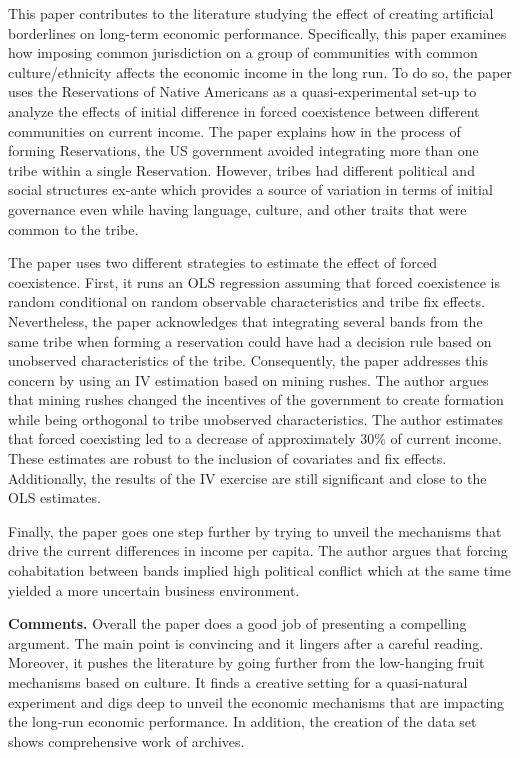 This paper contributes to the literature studying the effect of creating artificial borderlines on long-term economic performance. Specifically, this paper examines how imposing common jurisdiction on a group of communities with common culture/ethnicity affects the economic income in the long run. To do so, the paper uses the Reservations of Native Americans as a quasi-experimental set-up to analyze the effects of initial difference in forced coexistence between different communities on current income. The paper explains how in the process of forming Reservations, the US government avoided integrating more than one tribe within a single Reservation. However, tribes had different political and social structures ex-ante which provides a source of variation in terms of initial governance even while having language, culture, and other traits that were common to the tribe. 

The paper uses two different strategies to estimate the effect of forced coexistence. First, it runs an OLS regression assuming that forced coexistence is random conditional on random observable characteristics and tribe fix effects. Nevertheless, the paper acknowledges that integrating several bands from the same tribe when forming a reservation could have had a decision rule based on unobserved characteristics of the tribe. Consequently, the paper addresses this concern by using an IV estimation based on mining rushes. The author argues that mining rushes changed the incentives of the government to create formation while being orthogonal to tribe unobserved characteristics. The author estimates that forced coexisting led to a decrease of approximately 30\% of current income. These estimates are robust to the inclusion of covariates and fix effects. Additionally, the results of the IV exercise are still significant and close to the OLS estimates. 

Finally, the paper goes one step further by trying to unveil the mechanisms that drive the current differences in income per capita. The author argues that forcing cohabitation between bands implied high political conflict which at the same time yielded a more uncertain business environment. 

\textbf{Comments.} Overall the paper does a good job of presenting a compelling argument. The main point is convincing and it lingers after a careful reading. Moreover, it pushes the literature by going further from the low-hanging fruit mechanisms based on culture. It finds a creative setting for a quasi-natural experiment and digs deep to unveil the economic mechanisms that are impacting the long-run economic performance. In addition, the creation of the data set shows comprehensive work of archives.


